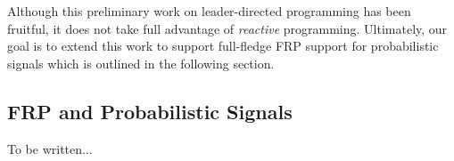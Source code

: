 Although this preliminary work on leader-directed programming has been fruitful, it does not take full advantage of \emph{reactive} programming.
Ultimately, our goal is to extend this work to support full-fledge FRP support for probabilistic signals which is outlined in the following section.


\subsection{FRP and Probabilistic Signals}

To be written...

